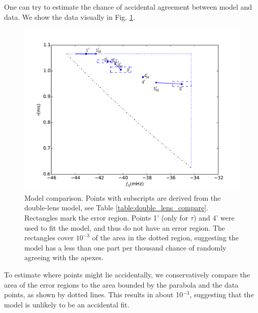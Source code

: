 \documentclass[useAMS,usenatbib]{mn2e}
\begin{document}
One can try to estimate the chance of accidental agreement between
model and data.
We show the data visually in Fig. \ref{fig:tau-fD}.  
\begin{figure}
\centering
\includegraphics[width=1.0\linewidth, angle=0]{tau-fD.pdf}
\caption{Model comparison.
Points with subscripts are derived from the double-lens model, see
Table \ref{table:double_lens_compare}.  
Rectangles mark the error region.
Points 1' (only for $\tau$) and 4' were used to fit the model, and
thus do not have an error region.  The rectangles cover $10^{-3}$ of
the area in the dotted region, suggesting the model has a less than
one part per thousand chance of randomly agreeing with the apexes.
}
\label{fig:tau-fD}
\end{figure}

To estimate where points might lie accidentally, we conservatively
compare the area of the error regions to the area bounded by the
parabola and the data points, as shown by dotted lines.  This results
in about 10$^{-3}$, suggesting that the model is unlikely to be an
accidental fit.
\end{document}
